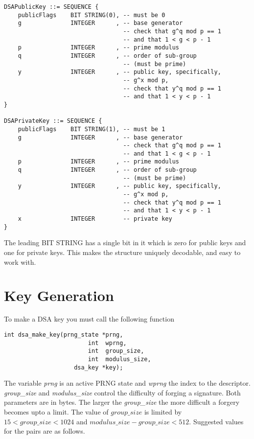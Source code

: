 \documentclass[synpaper]{book}
\newcommand{\mysection}[1]    %
	{                   %
	\section{#1}
   \markboth{\textsf{www.libtom.org}}{\thesection ~ {#1}}
	}
\begin{document}
\begin{verbatim}
DSAPublicKey ::= SEQUENCE {
    publicFlags    BIT STRING(0), -- must be 0
    g              INTEGER      , -- base generator
                                  -- check that g^q mod p == 1
                                  -- and that 1 < g < p - 1
    p              INTEGER      , -- prime modulus 
    q              INTEGER      , -- order of sub-group 
                                  -- (must be prime)
    y              INTEGER      , -- public key, specifically, 
                                  -- g^x mod p, 
                                  -- check that y^q mod p == 1
                                  -- and that 1 < y < p - 1
}

DSAPrivateKey ::= SEQUENCE {
    publicFlags    BIT STRING(1), -- must be 1
    g              INTEGER      , -- base generator
                                  -- check that g^q mod p == 1
                                  -- and that 1 < g < p - 1
    p              INTEGER      , -- prime modulus 
    q              INTEGER      , -- order of sub-group 
                                  -- (must be prime)
    y              INTEGER      , -- public key, specifically, 
                                  -- g^x mod p, 
                                  -- check that y^q mod p == 1
                                  -- and that 1 < y < p - 1
    x              INTEGER        -- private key
}
\end{verbatim}

The leading BIT STRING has a single bit in it which is zero for public keys and one for private keys.  This makes the structure uniquely decodable, 
and easy to work with.

\mysection{Key Generation}
To make a DSA key you must call the following function
\begin{verbatim}
int dsa_make_key(prng_state *prng, 
                        int  wprng, 
                        int  group_size, 
                        int  modulus_size, 
                    dsa_key *key);
\end{verbatim}
The variable \textit{prng} is an active PRNG state and \textit{wprng} the index to the descriptor.  \textit{group\_size} and 
\textit{modulus\_size} control the difficulty of forging a signature.  Both parameters are in bytes.  The larger the
\textit{group\_size} the more difficult a forgery becomes upto a limit.  The value of $group\_size$ is limited by 
$15 < group\_size < 1024$ and $modulus\_size - group\_size < 512$.  Suggested values for the pairs are as follows.
\end{document}
